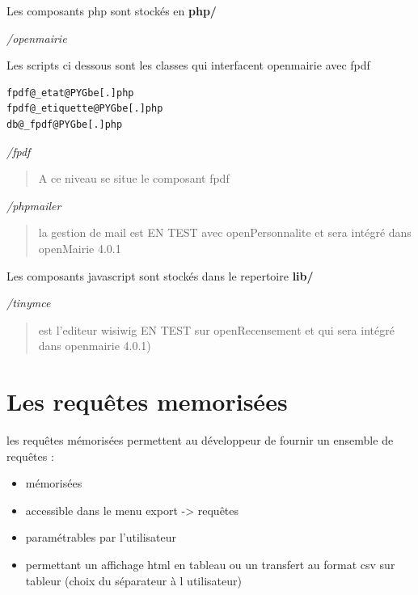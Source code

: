 \documentclass[letterpaper,10pt,french]{manual}
\begin{document}
Les composants php sont stockés en \textbf{php/}

\emph{/openmairie}

Les scripts ci dessous sont les classes qui interfacent openmairie avec fpdf

\begin{Verbatim}[commandchars=@\[\]]
fpdf@_etat@PYGbe[.]php
fpdf@_etiquette@PYGbe[.]php
db@_fpdf@PYGbe[.]php
\end{Verbatim}

\emph{/fpdf}
\begin{quote}

A ce niveau se situe le composant fpdf
\end{quote}

\emph{/phpmailer}
\begin{quote}

la gestion de mail est EN TEST avec openPersonnalite et sera intégré dans  openMairie 4.0.1
\end{quote}

Les composants javascript sont stockés dans le repertoire \textbf{lib/}

\emph{/tinymce}
\begin{quote}

est l'editeur wisiwig   EN TEST sur openRecensement et qui sera intégré dans openmairie 4.0.1)
\end{quote}

\resetcurrentobjects
\hypertarget{--doc-framework/reqmo}{}

\hypertarget{reqmo}{}\section{Les requêtes memorisées}

les requêtes mémorisées permettent au développeur de fournir un ensemble de requêtes :
\begin{itemize}
\item {} 
mémorisées

\item {} 
accessible dans le menu export -\textgreater{} requêtes

\item {} 
paramétrables par l'utilisateur

\item {} 
permettant un affichage html en tableau ou un transfert au format csv sur tableur (choix du séparateur à l utilisateur)

\end{itemize}
\end{document}

